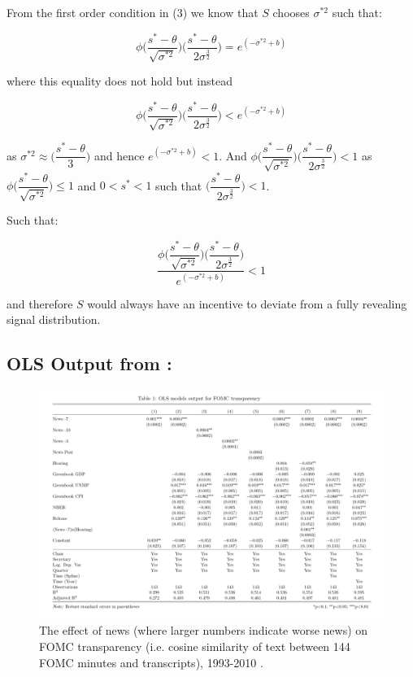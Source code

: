 \documentclass[paper=a4,12pt,DIV=11,twoside=false]{scrartcl}
\begin{document}
From the first order condition in (3) we know that $S$ chooses $\sigma^{*2}$ such that:

\begin{equation}
\phi\Big(\dfrac{s^{*}-\theta}{\sqrt{\sigma^{*2}}}\Big)\Big(\dfrac{s^{*}-\theta}{2\sigma^{\frac{3}{2}}}\Big) = e^{(-\sigma^{*2} + b)}
\end{equation}

where this equality does not hold but instead

\begin{equation}
\phi\Big(\dfrac{s^{*}-\theta}{\sqrt{\sigma^{*2}}}\Big)\Big(\dfrac{s^{*}-\theta}{2\sigma^{\frac{3}{2}}}\Big) < e^{(-\sigma^{*2} + b)}
\end{equation}

as $\sigma^{*2} \approx \Big(\dfrac{s^{*}-\theta}{3}\Big)$ and hence $e^{(-\sigma^{*2} + b)}<1$. And $\phi\Big(\dfrac{s^{*}-\theta}{\sqrt{\sigma^{*2}}}\Big)\Big(\dfrac{s^{*}-\theta}{2\sigma^{\frac{3}{2}}}\Big)<1$ as $\phi\Big(\dfrac{s^{*}-\theta}{\sqrt{\sigma^{*2}}}\Big) \leq 1$ and $0<s^{*}<1$ such that $\Big(\dfrac{s^{*}-\theta}{2\sigma^{\frac{3}{2}}}\Big)<1$. 

Such that:

\begin{equation}
\dfrac{\phi\Big(\dfrac{s^{*}-\theta}{\sqrt{\sigma^{*2}}}\Big)\Big(\dfrac{s^{*}-\theta}{2\sigma^{\frac{3}{2}}}\Big)}{e^{(-\sigma^{*2} + b)}}<1
\end{equation}

and therefore $S$ would always have an incentive to deviate from a fully revealing signal distribution.


\subsection{OLS Output from \citep{GL2017}:}
\begin{figure}[h]
\centering
\includegraphics[width=\textwidth]{ols.pdf}
\caption{The effect of news (where larger numbers indicate worse news) on FOMC transparency (i.e. cosine similarity of text between 144 FOMC minutes and transcripts), 1993-2010 \citep{GL2017}.}
\label{fig:ols}
\end{figure}


\newpage
\nocite{*}


\end{document}
